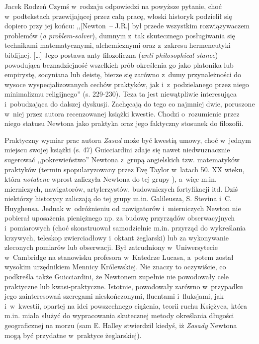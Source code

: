 \begin{recplenv}{Jacek Rodzeń}
Czymś w~rodzaju odpowiedzi na powyższe pytanie, choć w~podtekstach przewijającej przez całą pracę, włoski historyk
podzielił się dopiero przy jej końcu: ,,[Newton~-- J.R.] był przede wszystkim rozwiązywaczem problemów (\textit{a
problem-solver}), dumnym z~tak skutecznego posługiwania się technikami matematycznymi, alchemicznymi oraz z~zakresu
hermeneutyki biblijnej. […] Jego postawa anty-filozoficzna (\textit{anti-philosophical stance}) powodująca
beznadziejność wszelkich prób określenia go jako platonika lub empirystę, socyniana lub deistę, bierze się
zarówno z~dumy przynależności do wysoce wyspecjalizowanych cechów praktyków, jak i~z~podzielanego przez niego minimalizmu
religijnego'' (s. 229-230). Teza ta jest niewątpliwie interesująca i~pobudzająca do dalszej dyskusji. Zachęcają do tego
co najmniej dwie, poruszone w~niej przez autora recenzowanej książki kwestie. Chodzi o~rozumienie przez niego statusu
Newtona jako praktyka oraz jego faktyczny stosunek do filozofii. 

Praktyczny wymiar prac autora \textit{Zasad} może być kwestią umowy, choć w~jednym miejscu swojej książki (s. 47)
Guicciardini zdaje się nawet niedwuznacznie sugerować ,,pokrewieństwo'' Newtona z~grupą angielskich tzw. matematyków
praktyków (termin spopularyzowany przez Evę Taylor w~latach 50. XX wieku, która \textit{notabene} wprost zaliczyła
Newtona do tej grupy \parencite[zob.][]{taylor_mathematical_1954}), a~więc m.in. mierniczych, nawigatorów, artylerzystów, budowniczych fortyfikacji itd. Dziś
niektórzy historycy zaliczają do tej grupy m.in. Galileusza, S. Stevina i~C. Huyghensa. Jednak w~odróżnieniu od
nawigatorów i~mierniczych Newton nie pobierał uposażenia pieniężnego np. za budowę przyrządów
obserwacyjnych i~pomiarowych (choć skonstruował samodzielnie m.in. przyrząd do wykreślania krzywych,
teleskop zwierciadłowy i~oktant
żeglarski) lub za wykonywanie zleconych pomiarów lub obserwacji. Był zatrudniony w~Uniwersytecie w~Cambridge na
stanowisku profesora w~Katedrze Lucasa, a~potem został wysokim urzędnikiem Mennicy Królewskiej. Nie znaczy to
oczywiście, co podkreśla także Guicciardini, że Newtonem zupełnie nie powodowały cele praktyczne lub kwasi-praktyczne.
Istotnie, powodowały zarówno w~przypadku jego zainteresowań szeregami nieskończonymi, fluentami i~fluksjami,
jak i~w~kwestii, opartej na idei powszechnego ciążenia, teorii ruchu Księżyca, która m.in. miała służyć do wypracowania
skutecznej metody określania długości geograficznej na morzu (sam E. Halley stwierdził kiedyś, iż \textit{Zasady}
Newtona mogą być przydatne w~praktyce żeglarskiej).


\end{recplenv}
